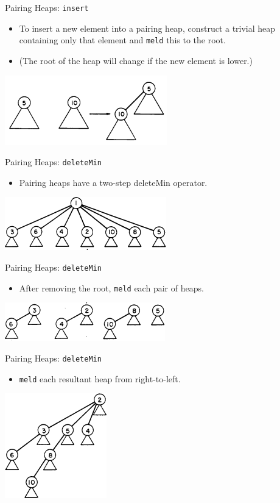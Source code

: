 \documentclass{beamer}
\begin{document}
\begin{frame}{Pairing Heaps: \texttt{insert}}
  \begin{itemize}
    \item To insert a new element into a pairing heap, construct a
      trivial heap containing only that element and \texttt{meld}
      this to the root.
    \item (The root of the heap will change if the new element is lower.)
  \end{itemize}
  \includegraphics[scale=1.0]{img/meld.png}
\end{frame}

\begin{frame}{Pairing Heaps: \texttt{deleteMin}}
  \begin{itemize}
    \item Pairing heaps have a two-step deleteMin operator.
  \end{itemize}
  \includegraphics[scale=1.0]{img/deleteMin1.png}
\end{frame}

\begin{frame}{Pairing Heaps: \texttt{deleteMin}}
  \begin{itemize}
    \item After removing the root, \texttt{meld} each pair of heaps.
  \end{itemize}
  \includegraphics[scale=1.0]{img/deleteMin2.png}
\end{frame}

\begin{frame}{Pairing Heaps: \texttt{deleteMin}}
  \begin{itemize}
    \item \texttt{meld} each resultant heap from right-to-left.
  \end{itemize}
  \includegraphics[scale=1.0]{img/deleteMin3.png}
\end{frame}
\end{document}
